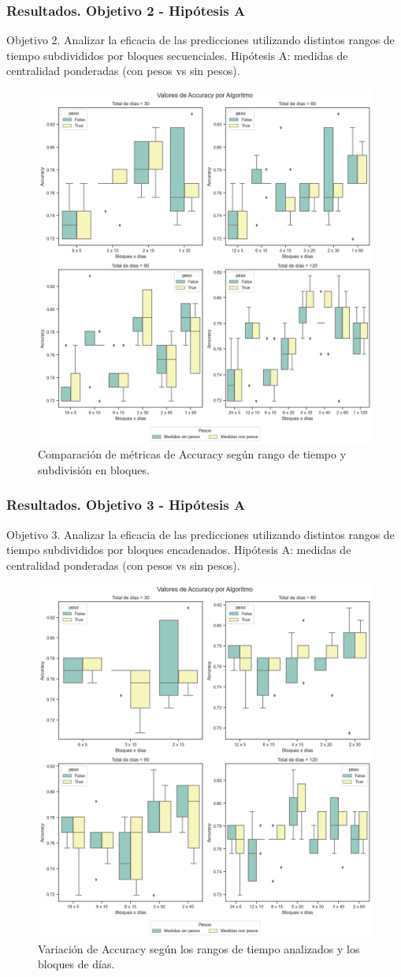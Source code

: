 \documentclass{beamer}
\begin{document}
\begin{frame}
	\frametitle{Resultados. Objetivo 2 - Hipótesis A}
	\begin{block}{Objetivo 2. Analizar la eficacia de las predicciones utilizando distintos rangos de tiempo subdivididos por bloques secuenciales.}
		Hipótesis A: medidas de centralidad ponderadas (con pesos vs sin pesos).
	\end{block}
	
\begin{figure}[H]
	\centering
	\includegraphics[width=0.45\linewidth]{figs/cap6/figura_26}
	\caption{Comparación de métricas de Accuracy según rango de tiempo y subdivisión en bloques.}
	\label{fig:figura45}
\end{figure}
	
\end{frame}

\begin{frame}
	\frametitle{Resultados. Objetivo 3 - Hipótesis A}
	\begin{block}{Objetivo 3. Analizar la eficacia de las predicciones utilizando distintos rangos de tiempo subdivididos por bloques encadenados.}
		Hipótesis A: medidas de centralidad ponderadas (con pesos vs sin pesos).
	\end{block}
	
\begin{figure}[H]
	\centering
	\includegraphics[width=0.45\linewidth]{figs/cap6/figura_84}
	\caption{Variación de Accuracy según los rangos de tiempo analizados y los bloques de días.}
	
	\label{fig:figura84}
\end{figure}

\end{frame}
\end{document}
